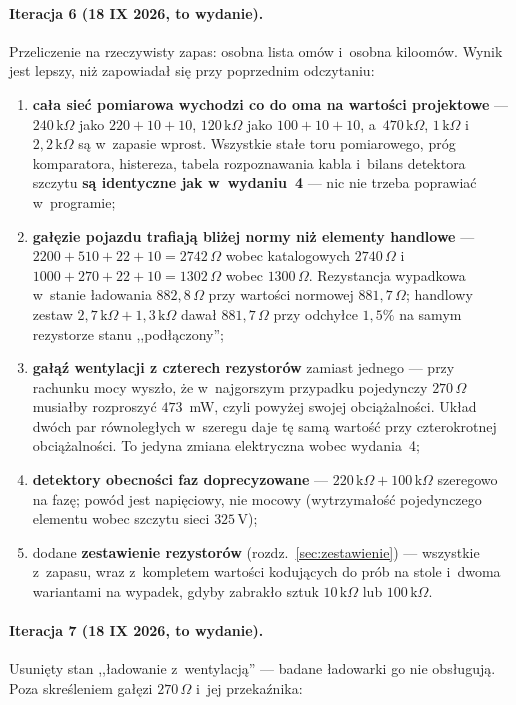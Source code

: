 \documentclass[a4paper,11pt]{article}
\newcommand{\ohm}{\,\Omega}
\newcommand{\kohm}{\,\mathrm{k}\Omega}
\newcommand{\volt}{\,\mathrm{V}}
\begin{document}
\paragraph{Iteracja 6 (18 IX 2026, to wydanie).} Przeliczenie na rzeczywisty zapas:
osobna lista omów i~osobna kiloomów. Wynik jest lepszy, niż zapowiadał się przy
poprzednim odczytaniu:

\begin{enumerate}
\item \textbf{cała sieć pomiarowa wychodzi co do oma na wartości projektowe} ---
      $240\kohm$ jako $220+10+10$, $120\kohm$ jako $100+10+10$, a~$470\kohm$,
      $1\kohm$ i~$2{,}2\kohm$ są w~zapasie wprost. Wszystkie stałe toru pomiarowego,
      próg komparatora, histereza, tabela rozpoznawania kabla i~bilans detektora
      szczytu \textbf{są identyczne jak w~wydaniu~4} --- nic nie trzeba poprawiać
      w~programie;
\item \textbf{gałęzie pojazdu trafiają bliżej normy niż elementy handlowe} ---
      $2200+510+22+10=2742\ohm$ wobec katalogowych $2740\ohm$ i~$1000+270+22+10
      =1302\ohm$ wobec $1300\ohm$. Rezystancja wypadkowa w~stanie ładowania
      $882{,}8\ohm$ przy wartości normowej $881{,}7\ohm$; handlowy zestaw
      $2{,}7\kohm + 1{,}3\kohm$ dawał $881{,}7\ohm$ przy odchyłce $1{,}5\%$
      na samym rezystorze stanu ,,podłączony'';
\item \textbf{gałąź wentylacji z czterech rezystorów} zamiast jednego --- przy
      rachunku mocy wyszło, że w~najgorszym przypadku pojedynczy $270\ohm$ musiałby
      rozproszyć $473$~mW, czyli powyżej swojej obciążalności. Układ dwóch par
      równoległych w~szeregu daje tę samą wartość przy czterokrotnej obciążalności.
      To jedyna zmiana elektryczna wobec wydania~4;
\item \textbf{detektory obecności faz doprecyzowane} --- $220\kohm+100\kohm$
      szeregowo na fazę; powód jest napięciowy, nie mocowy (wytrzymałość
      pojedynczego elementu wobec szczytu sieci $325\volt$);
\item dodane \textbf{zestawienie rezystorów} (rozdz.~\ref{sec:zestawienie}) ---
      wszystkie z~zapasu, wraz z~kompletem wartości kodujących do prób
      na stole i~dwoma wariantami na wypadek, gdyby zabrakło sztuk $10\kohm$
      lub $100\kohm$.
\end{enumerate}

\paragraph{Iteracja 7 (18 IX 2026, to wydanie).} Usunięty stan ,,ładowanie
z~wentylacją'' --- badane ładowarki go nie obsługują. Poza skreśleniem gałęzi
$270\ohm$ i~jej przekaźnika:
\end{document}
